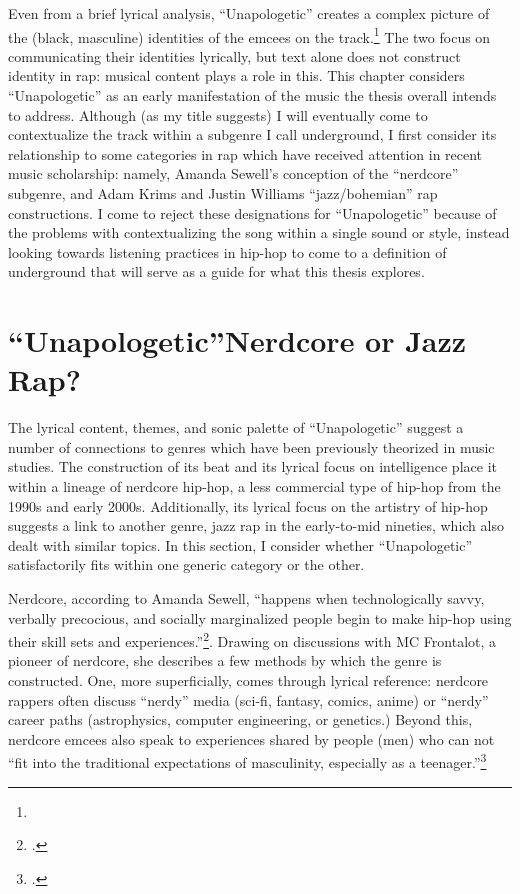 Even from a brief lyrical analysis, ``Unapologetic'' creates a complex picture of the (black,
masculine) identities of the emcees on the track.\footnote{
    } 
The two focus on communicating their identities lyrically, but text alone does not construct
identity in rap: musical content plays a role in this. This chapter considers ``Unapologetic'' 
as an early manifestation of the music the thesis overall intends to address. Although (as my 
title suggests) I will eventually come to contextualize the track within a subgenre I call 
underground, I first consider its relationship to some categories in rap which have received 
attention in recent music scholarship: namely, Amanda Sewell's conception of the ``nerdcore''
subgenre, and Adam Krims  and Justin Williams ``jazz/bohemian'' rap constructions. I come to 
reject these designations for  ``Unapologetic'' because of the problems with contextualizing 
the song within a single sound or style, instead looking towards listening practices in hip-hop
to come to a definition of underground that will serve as a guide for what this thesis explores.


\section{``Unapologetic''\textemdash Nerdcore or Jazz Rap?} \label{unapologeticnerdcorejazz}

The lyrical content, themes, and sonic palette of ``Unapologetic'' suggest a number of connections 
to genres which have been previously theorized in music studies. The construction of its beat and 
its lyrical focus on intelligence place it within a lineage of nerdcore hip-hop, a less commercial
type of hip-hop from the 1990s and early 2000s. Additionally, its lyrical focus on the artistry of 
hip-hop suggests a link to another genre, jazz rap in the early-to-mid nineties, which also dealt 
with similar topics. In this section, I consider whether ``Unapologetic'' satisfactorily fits within
one generic category or the other.

Nerdcore, according to Amanda Sewell, ``happens when technologically savvy, verbally precocious, and
socially marginalized people begin to make hip-hop using their skill sets and 
experiences.''\footnote{
    \autocite[223]{amandasewellNerdcoreHiphop2015}.}. 
Drawing on discussions with MC Frontalot, a pioneer of nerdcore, she describes a few methods by which
the genre is  constructed. One, more superficially, comes through lyrical reference: nerdcore rappers 
often discuss ``nerdy'' media  (sci-fi, fantasy, comics, anime) or ``nerdy'' career paths (astrophysics,
computer engineering, or genetics.) Beyond this, nerdcore emcees also speak to experiences shared by 
people (men) who can not ``fit into the traditional expectations of masculinity, especially as 
a teenager.''\footnote{
    \autocite[225]{amandasewellNerdcoreHiphop2015}.} 

